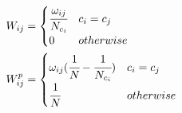 \documentclass{ctexart}
\begin{document}
    \begin{align}
        W_{ij}&=
        \begin{cases}
        \cfrac{\omega_{ij}}{N_{c_i}} & c_i=c_j \\
                0                   & otherwise
        \end{cases}\\
        W_{ij}^p&=
        \begin{cases}
        \omega_{ij}(\cfrac{1}{N}-\cfrac{1}{N_{c_i}}) & c_i=c_j\\
        \cfrac{1}{N}                                & otherwise
        \end{cases}
    \end{align}
  
\end{document}
